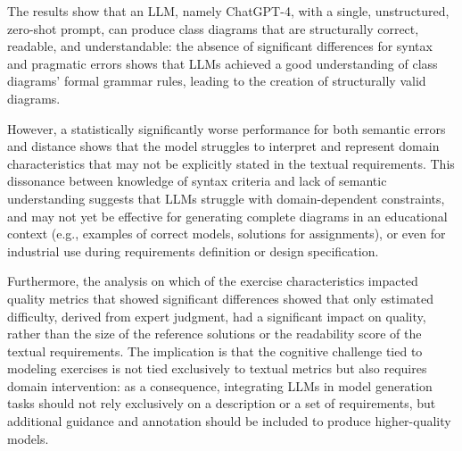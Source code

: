 The results show that an LLM, namely ChatGPT-4, with a single, unstructured, zero-shot prompt, can produce class diagrams that are structurally correct, readable, and understandable: the absence of significant differences for syntax and pragmatic errors shows that LLMs achieved a good understanding of class diagrams' formal grammar rules, leading to the creation of structurally valid diagrams.

However, a statistically significantly worse performance for both semantic errors and distance shows that the model struggles to interpret and represent domain characteristics that may not be explicitly stated in the textual requirements. This dissonance between knowledge of syntax criteria and lack of semantic understanding suggests that LLMs struggle with domain-dependent constraints, and may not yet be effective for generating complete diagrams in an educational context (e.g., examples of correct models, solutions for assignments), or even for industrial use during requirements definition or design specification.

Furthermore, the analysis on which of the exercise characteristics impacted quality metrics that showed significant differences showed that only estimated difficulty, derived from expert judgment, had a significant impact on quality, rather than the size of the reference solutions or the readability score of the textual requirements. The implication is that the cognitive challenge tied to modeling exercises is not tied exclusively to textual metrics but also requires domain intervention: as a consequence, integrating LLMs in model generation tasks should not rely exclusively on a description or a set of requirements, but additional guidance and annotation should be included to produce higher-quality models.



